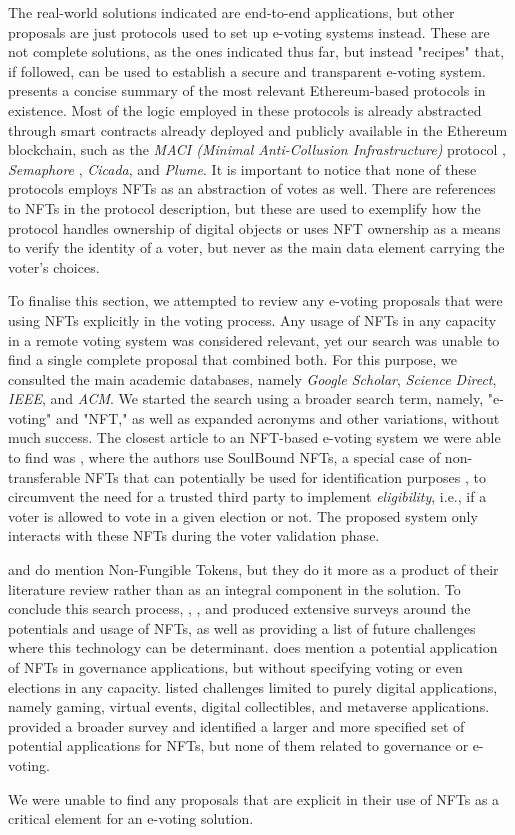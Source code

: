 \documentclass[../main.tex]{subfiles}
\begin{document}
\par
The real-world solutions indicated are end-to-end applications, but other proposals are just protocols used to set up e-voting systems instead. These are not complete solutions, as the ones indicated thus far, but instead "recipes" that, if followed, can be used to establish a secure and transparent e-voting system. \cite{Lamtzidis2023} presents a concise summary of the most relevant Ethereum-based protocols in existence. Most of the logic employed in these protocols is already abstracted through smart contracts already deployed and publicly available in the Ethereum blockchain, such as the \textit{MACI (Minimal Anti-Collusion Infrastructure)} protocol \cite{MACI2024}, \textit{Semaphore} \cite{Semaphore2024}, \textit{Cicada}, and \textit{Plume}. It is important to notice that none of these protocols employs NFTs as an abstraction of votes as well. There are references to NFTs in the protocol description, but these are used to exemplify how the protocol handles ownership of digital objects or uses NFT ownership as a means to verify the identity of a voter, but never as the main data element carrying the voter's choices.
\par
To finalise this section, we attempted to review any e-voting proposals that were using NFTs explicitly in the voting process. Any usage of NFTs in any capacity in a remote voting system was considered relevant, yet our search was unable to find a single complete proposal that combined both. For this purpose, we consulted the main academic databases, namely \textit{Google Scholar}, \textit{Science Direct}, \textit{IEEE}, and \textit{ACM}. We started the search using a broader search term, namely, "e-voting" and "NFT," as well as expanded acronyms and other variations, without much success. The closest article to an NFT-based e-voting system we were able to find was \cite{Sagar2023}, where the authors use SoulBound NFTs, a special case of non-transferable NFTs that can potentially be used for identification purposes \cite{Weyl2022}, to circumvent the need for a trusted third party to implement \textit{eligibility}, i.e., if a voter is allowed to vote in a given election or not. The proposed system only interacts with these NFTs during the voter validation phase.
\par
\cite{Bistarelli2022} and \cite{Agbesi2019} do mention Non-Fungible Tokens, but they do it more as a product of their literature review rather than as an integral component in the solution. To conclude this search process, \cite{Ali2023}, \cite{Bao2022}, and \cite{Wang2021} produced extensive surveys around the potentials and usage of NFTs, as well as providing a list of future challenges where this technology can be determinant. \cite{Ali2023} does mention a potential application of NFTs in governance applications, but without specifying voting or even elections in any capacity. \cite{Wang2021} listed challenges limited to purely digital applications, namely gaming, virtual events, digital collectibles, and metaverse applications. \cite{Bao2022} provided a broader survey and identified a larger and more specified set of potential applications for NFTs, but none of them related to governance or e-voting.
\par
We were unable to find any proposals that are explicit in their use of NFTs as a critical element for an e-voting solution.
\end{document}
